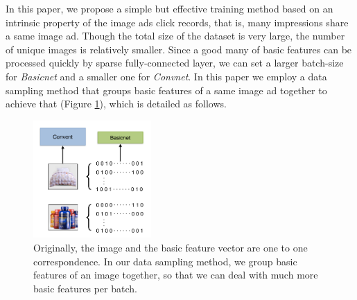\documentclass{sig-alternate}
\begin{document}
In this paper, we propose a simple but effective training method based on an intrinsic property of the image ads click records, that is, many impressions share a same image ad. Though the total size of the dataset is very large, the number of unique images is relatively smaller. Since a good many of basic features can be processed quickly by sparse fully-connected layer, we can set a larger batch-size for \emph{Basicnet} and a smaller one for \emph{Convnet}. In this paper we employ a data sampling method that groups basic features of a same image ad together to achieve that (Figure \ref{fig:sampling}), which is detailed as follows.
\begin{figure}
	\centering
	\includegraphics[width=0.4\textwidth]{sampling}
	\caption{Originally, the image and the basic feature vector are one to one correspondence. In our data sampling method, we group basic features of an image together, so that we can deal with much more basic features per batch. }
	\label{fig:sampling}
\end{figure}
\end{document}
